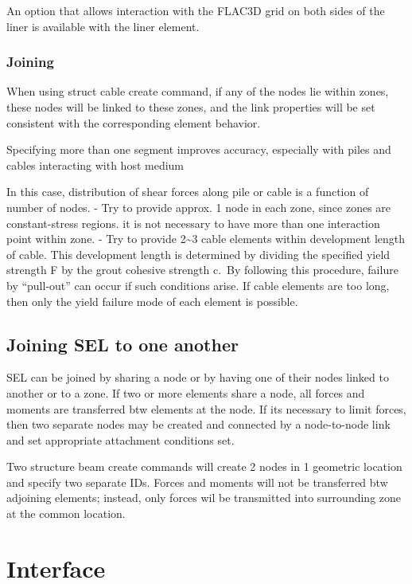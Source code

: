 \documentclass[a4paper, nobind]{templates/ociamthesis}
\begin{document}
An option that allows interaction with the FLAC3D grid on both sides of
the liner is available with the liner element.

\hypertarget{joining}{%
\subsubsection{Joining}\label{joining}}

When using struct cable create command, if any of the nodes lie within
zones, these nodes will be linked to these zones, and the link
properties will be set consistent with the corresponding element
behavior.

Specifying more than one segment improves accuracy, especially with
piles and cables interacting with host medium

In this case, distribution of shear forces along pile or cable is a
function of number of nodes. - Try to provide approx. 1 node in each
zone, since zones are constant-stress regions. it is not necessary to
have more than one interaction point within zone. - Try to provide 2\textasciitilde3
cable elements within development length of cable. This development
length is determined by dividing the specified yield strength F by the
grout cohesive strength c.~By following this procedure, failure by
``pull-out'' can occur if such conditions arise. If cable elements are too
long, then only the yield failure mode of each element is possible.

\hypertarget{joining-sel-to-one-another}{%
\subsection{Joining SEL to one another}\label{joining-sel-to-one-another}}

SEL can be joined by sharing a node or by having one of their nodes
linked to another or to a zone. If two or more elements share a node,
all forces and moments are transferred btw elements at the node. If its
necessary to limit forces, then two separate nodes may be created and
connected by a node-to-node link and set appropriate attachment
conditions set.

Two structure beam create commands will create 2 nodes in 1 geometric
location and specify two separate IDs. Forces and moments will not be
transferred btw adjoining elements; instead, only forces wil be
transmitted into surrounding zone at the common location.

\hypertarget{interface-1}{%
\section{Interface}\label{interface-1}}
\end{document}
